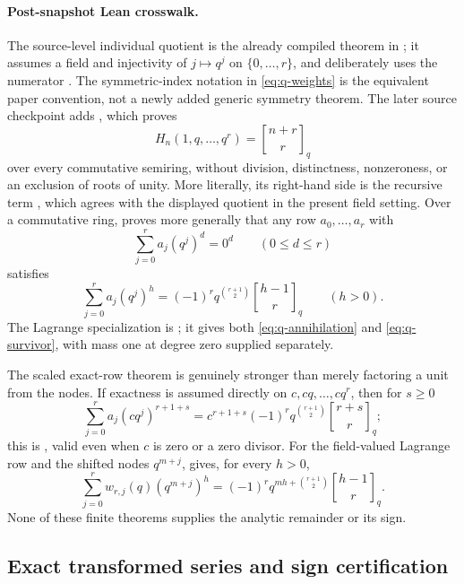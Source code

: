 \documentclass[11pt,oneside]{article}
\numberwithin{equation}{section}
\theoremstyle{definition}
\theoremstyle{remark}
\newcommand{\qbinom}[3]{\genfrac{[}{]}{0pt}{}{#1}{#2}_{#3}}
\begin{document}
\paragraph{Post-snapshot Lean crosswalk.}
The source-level individual quotient is the already compiled theorem
 in
; it assumes a field and injectivity of
\(j\mapsto q^j\) on \(\{0,\ldots,r\}\), and deliberately uses the numerator
.  The symmetric-index notation in
\eqref{eq:q-weights} is the equivalent paper convention, not a newly added
generic symmetry theorem.  The later source checkpoint
 adds
, which proves
\[
 H_n(1,q,\ldots,q^r)=\qbinom{n+r}{r}{q}
\]
over every commutative semiring, without division, distinctness, nonzeroness, or
an exclusion of roots of unity.  More literally, its right-hand side is the
recursive term , which agrees with the
displayed quotient in the present field setting.  Over a commutative ring,
 proves more generally that any row
\(a_0,\ldots,a_r\) with
\[
 \sum_{j=0}^{r}a_j(q^j)^d=0^d\qquad(0\le d\le r)
\]
satisfies
\[
 \sum_{j=0}^{r}a_j(q^j)^h
 =(-1)^r q^{\binom{r+1}{2}}\qbinom{h-1}{r}{q}
 \qquad(h>0).
\]
The Lagrange specialization is
; it gives both
\eqref{eq:q-annihilation} and \eqref{eq:q-survivor}, with mass one at degree
zero supplied separately.

The scaled exact-row theorem is genuinely stronger than merely factoring a
unit from the nodes.  If exactness is assumed directly on
\(c,cq,\ldots,cq^r\), then for \(s\ge0\)
\[
 \sum_{j=0}^{r}a_j(cq^j)^{r+1+s}
 =c^{r+1+s}(-1)^r q^{\binom{r+1}{2}}
   \qbinom{r+s}{r}{q};
\]
this is , valid even when
\(c\) is zero or a zero divisor.  For the field-valued Lagrange row and the
shifted nodes \(q^{m+j}\),
 gives, for every
\(h>0\),
\[
 \sum_{j=0}^{r}w_{r,j}(q)(q^{m+j})^h
 =(-1)^r q^{mh+\binom{r+1}{2}}\qbinom{h-1}{r}{q}.
\]
None of these finite theorems supplies the analytic remainder or its sign.

\subsection{Exact transformed series and sign certification}
\end{document}
